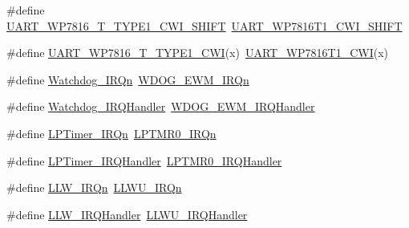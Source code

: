 \begin{DoxyCompactItemize}
\item 
\#define \mbox{\hyperlink{group___s_d_k___compatibility___symbols_gad9cb85843e4cabc17e896f27901df941}{U\+A\+R\+T\+\_\+\+W\+P7816\+\_\+\+T\+\_\+\+T\+Y\+P\+E1\+\_\+\+C\+W\+I\+\_\+\+S\+H\+I\+FT}}~\mbox{\hyperlink{group___u_a_r_t___register___masks_gaf78c95bd8fe42dfe6caeb8b9c8190e61}{U\+A\+R\+T\+\_\+\+W\+P7816\+T1\+\_\+\+C\+W\+I\+\_\+\+S\+H\+I\+FT}}
\item 
\#define \mbox{\hyperlink{group___s_d_k___compatibility___symbols_ga5326ca16b01f2260770c19cedaef87eb}{U\+A\+R\+T\+\_\+\+W\+P7816\+\_\+\+T\+\_\+\+T\+Y\+P\+E1\+\_\+\+C\+WI}}(x)~\mbox{\hyperlink{group___u_a_r_t___register___masks_ga4536e184765ba4b5fc283551be80dccc}{U\+A\+R\+T\+\_\+\+W\+P7816\+T1\+\_\+\+C\+WI}}(x)
\item 
\#define \mbox{\hyperlink{group___s_d_k___compatibility___symbols_gabd83dbd0f4d0283ee385793ca1c0235c}{Watchdog\+\_\+\+I\+R\+Qn}}~\mbox{\hyperlink{group___interrupt__vector__numbers_gga666eb0caeb12ec0e281415592ae89083a0bff68ffa0f6a24e0103f156f26487b3}{W\+D\+O\+G\+\_\+\+E\+W\+M\+\_\+\+I\+R\+Qn}}
\item 
\#define \mbox{\hyperlink{group___s_d_k___compatibility___symbols_ga61811e1979ff6b63d9dec917234410c3}{Watchdog\+\_\+\+I\+R\+Q\+Handler}}~\mbox{\hyperlink{startup__mk64f12_8c_afdad131f6885761992073c09894b7c8f}{W\+D\+O\+G\+\_\+\+E\+W\+M\+\_\+\+I\+R\+Q\+Handler}}
\item 
\#define \mbox{\hyperlink{group___s_d_k___compatibility___symbols_gae70db9fba78d2f2520aba766b56a8fa4}{L\+P\+Timer\+\_\+\+I\+R\+Qn}}~\mbox{\hyperlink{group___interrupt__vector__numbers_gga666eb0caeb12ec0e281415592ae89083a93853a8a41060ac37aa92ae9ee472c6e}{L\+P\+T\+M\+R0\+\_\+\+I\+R\+Qn}}
\item 
\#define \mbox{\hyperlink{group___s_d_k___compatibility___symbols_gaa4b25b811fbffef4560169501de8c4dc}{L\+P\+Timer\+\_\+\+I\+R\+Q\+Handler}}~\mbox{\hyperlink{startup__mk64f12_8c_aac32567705ff8951431836d700bddbc5}{L\+P\+T\+M\+R0\+\_\+\+I\+R\+Q\+Handler}}
\item 
\#define \mbox{\hyperlink{group___s_d_k___compatibility___symbols_gaed0de9c6743ef575032bcb7b77565595}{L\+L\+W\+\_\+\+I\+R\+Qn}}~\mbox{\hyperlink{group___interrupt__vector__numbers_gga666eb0caeb12ec0e281415592ae89083a8b7bac6898a42e6dadf89d7c8b07baaa}{L\+L\+W\+U\+\_\+\+I\+R\+Qn}}
\item 
\#define \mbox{\hyperlink{group___s_d_k___compatibility___symbols_gad900a40981e6d21c91f4db59c6c87144}{L\+L\+W\+\_\+\+I\+R\+Q\+Handler}}~\mbox{\hyperlink{startup__mk64f12_8c_af4f61bb27e407be2d1b29d425f45108d}{L\+L\+W\+U\+\_\+\+I\+R\+Q\+Handler}}

\end{DoxyCompactItemize}
